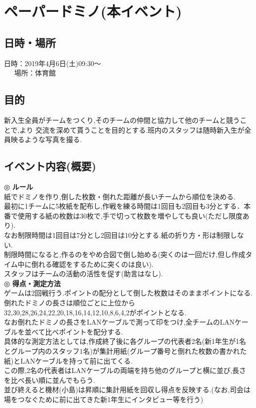 \documentclass[a4j]{jarticle}
\begin{document}
\section{ペーパードミノ(本イベント)}
\subsection{日時・場所}
日時：2019年4月6日(土)09:30〜\\
\ \ \ 場所：体育館\\
\subsection{目的}
新入生全員がチームをつくり,そのチームの仲間と協力して他のチームと競うことで,より
交流を深めて貰うことを目的とする.班内のスタッフは随時新入生が全員映るような写真を撮る.
\subsection{イベント内容(概要)}
\hspace{-5mm}
◎ \textbf{ルール} \\
紙でドミノを作り,倒した枚数・倒れた距離が長いチームから順位を決める.\\
最初に1チームに5枚紙を配布し,作戦を練る時間は1回目も2回目も3分とする．本番で使用する紙の枚数は30枚で,手で切って枚数を増やしても良い(ただし限度あり). \\
なお制限時間は1回目は7分とし2回目は10分とする.紙の折り方・形は制限しない. \\
制限時間になると,作るのをやめ合図で倒し始める(突くのは一回だけ,但し作成タイム中に倒れる確認をするために突くのは良い). \\
スタッフはチームの活動の活性を促す(助言はなし).\\
◎ \textbf{得点・測定方法} \\
ゲームは2回戦行う.ポイントの配分として倒した枚数はそのままポイントになる.\\
倒れたドミノの長さは順位ごとに上位から32,30,28,26,24,22,20,18,16,14,12,10,8,6,4,2がポイントとなる.\\
なお倒れたドミノの長さをLANケーブルで測って印をつけ,全チームのLANケーブルを並べて比べポイントを配分する.\\
具体的な測定方法としては,作成終了後に各グループの代表者2名(新1年生が1名とグループ内のスタッフ1名)が集計用紙(グループ番号と倒れた枚数の書かれた紙)とLANケーブルを持って前に出てくる.\\
この際,2名の代表者はLANケーブルの両端を持ち他のグループと横に並び,長さを比べ長い順に並んでもらう.\\
並び終えると機材(小島)は昇順に集計用紙を回収し得点を反映する.(なお,司会は場をつなぐために前に出てきた新1年生にインタビュー等を行う)
\end{document}

